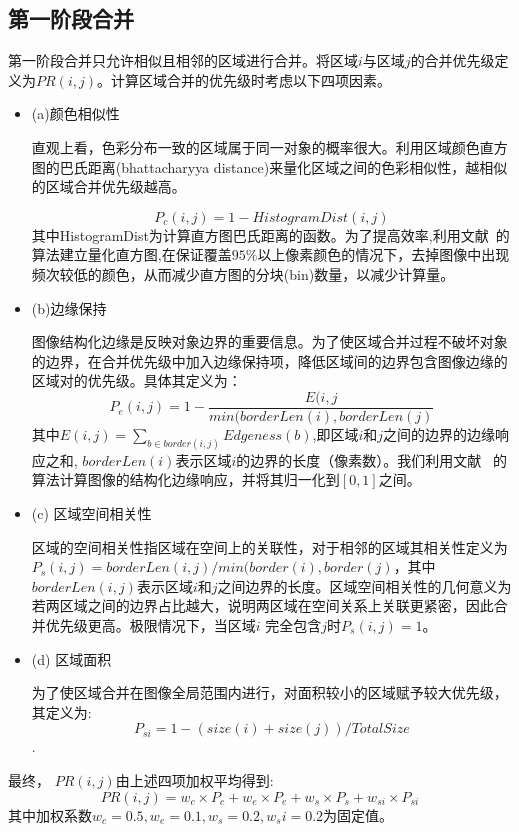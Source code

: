 \subsection{第一阶段合并}
\label{subsec:mergeP1}
第一阶段合并只允许相似且相邻的区域进行合并。将区域$i$与区域$j$的合并优先级定义为$PR(i,j)$。计算区域合并的优先级时考虑以下四项因素。
\begin{itemize}
\item (a)颜色相似性\par
    直观上看，色彩分布一致的区域属于同一对象的概率很大。利用区域颜色直方图的巴氏距离(bhattacharyya distance)来量化区域之间的色彩相似性，越相似的区域合并优先级越高。

    \begin{equation}
    \label{equ:chap2:Pc}
    P_{c}(i,j)=1-HistogramDist(i,j)
    \end{equation}
    其中HistogramDist为计算直方图巴氏距离的函数。为了提高效率,利用文献~的算法建立量化直方图,在保证覆盖$95\%$以上像素颜色的情况下，去掉图像中出现频次较低的颜色，从而减少直方图的分块(bin)数量，以减少计算量。
\item (b)边缘保持\par
    图像结构化边缘是反映对象边界的重要信息。为了使区域合并过程不破坏对象的边界，在合并优先级中加入边缘保持项，降低区域间的边界包含图像边缘的区域对的优先级。具体其定义为：
    $$P_{e}(i,j)=1-\frac{E(i,j}{min(borderLen(i),borderLen(j)}$$
    其中$E(i,j)=\sum_{b\in border(i,j)}Edgeness(b)$,即区域$i$和$j$之间的边界的边缘响应之和, $borderLen(i)$表示区域$i$的边界的长度（像素数）。我们利用文献~ 的算法计算图像的结构化边缘响应，并将其归一化到$[0,1]$之间。
\item (c) 区域空间相关性\par
    区域的空间相关性指区域在空间上的关联性，对于相邻的区域其相关性定义为$P_{s} (i,j)=borderLen(i,j)/min⁡(border(i),border(j)$，其中 $borderLen(i,j)$表示区域$i$和$j$之间边界的长度。区域空间相关性的几何意义为若两区域之间的边界占比越大，说明两区域在空间关系上关联更紧密，因此合并优先级更高。极限情况下，当区域$i$ 完全包含$j$时$P_{s} (i,j)=1$。
\item (d) 区域面积\par
    为了使区域合并在图像全局范围内进行，对面积较小的区域赋予较大优先级，其定义为:
    $$P_{si}=1-(size(i)+size(j))/TotalSize$$.

\end{itemize}
最终， $PR(i,j)$由上述四项加权平均得到:
\begin{equation}
   \label{equ:chap2:PR}
   PR(i,j)=w_{c}\times P_{c}+w_{e} \times P_{e} + w_{s} \times P_{s} + w_{si} \times P_{si}
\end{equation}
其中加权系数$w_c=0.5, w_e=0.1, w_s=0.2, w_si=0.2$为固定值。\par

